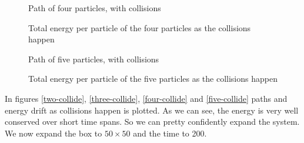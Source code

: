 \documentclass[10pt,a4paper,aps,twocolumn,secnumarabic,numerical,balancelastpage,nofootinbib,superscriptaddress]{revtex4-2}
\begin{document}
		\begin{figure*}[htb]
			\centering
			\begin{subfigure}{.45\textwidth}
				\hspace*{-2cm}\scalebox{0.8}{}
				\caption{Path of four particles, with collisions}
			\end{subfigure}
			\begin{subfigure}{.45\textwidth}
				\scalebox{0.6}{}
				\caption{Total energy per particle of the four particles as the collisions happen}
			\end{subfigure}
			\caption{\label{four-collide}Five particles over a short time scale}
		\end{figure*}
		
		\begin{figure*}[htb]
			\centering
			\begin{subfigure}{.45\textwidth}
				\hspace*{-2cm}\scalebox{0.8}{}
				\caption{Path of five particles, with collisions}
			\end{subfigure}
			\begin{subfigure}{.45\textwidth}
				\scalebox{0.6}{}
				\caption{Total energy per particle of the five particles as the collisions happen}
			\end{subfigure}
			\caption{\label{five-collide}Five particles over a short time scale}
		\end{figure*}
		In figures \ref{two-collide}, \ref{three-collide}, \ref{four-collide} and \ref{five-collide} paths and energy drift as collisions happen is plotted. As we can see, the energy is very well conserved over short time spans. So we can pretty confidently expand the system. We now expand the box to $50\times50$ and the time to 200.
		
\end{document}
